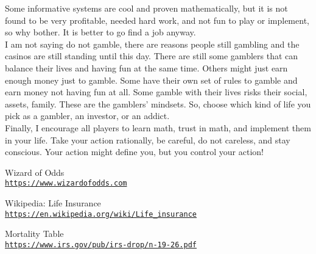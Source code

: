 \documentclass{article}
\begin{document}
Some informative systems are cool and proven mathematically, but it is not found to be  very profitable, needed hard work, and not fun to play or implement, so why bother.  It is better to go find a job anyway.\\

I am not saying do not gamble, there are reasons people still gambling and the casinos are still standing until this day.  There are still some gamblers that can balance their lives and having fun at the same time.  Others might just earn enough money just to gamble.  Some have their own set of rules to gamble and earn money not having fun at all. Some gamble with their lives risks their social, assets, family.  These are the gamblers' mindsets.  So, choose which kind of life you pick as a gambler, an investor, or an addict.\\

Finally, I encourage all players to learn math, trust in math, and implement them in your life.  Take your action rationally, be careful, do not careless, and stay conscious.  Your action might define you, but you control your action!
































  


\clearpage
\begin{thebibliography}{9}
 
Wizard of Odds
\\\texttt{\url{https://www.wizardofodds.com}}

\hypertarget{2}{}
Wikipedia: Life Insurance
\\\texttt{\url{https://en.wikipedia.org/wiki/Life_insurance}}


Mortality Table
\\\texttt{\url{https://www.irs.gov/pub/irs-drop/n-19-26.pdf}}

\end{thebibliography}
\end{document}
